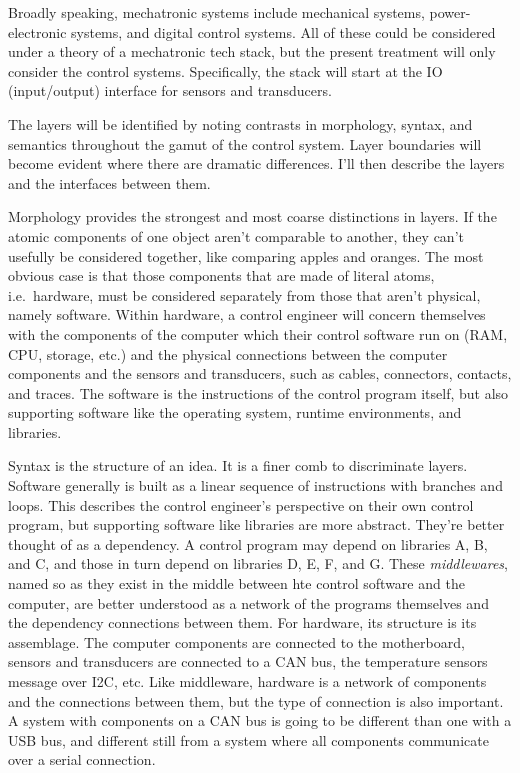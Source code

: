 \documentclass[english,12pt,a4paper,pdftex,eng,utf8]{aaltothesis}
\begin{document}
Broadly speaking, mechatronic systems include mechanical systems, power-electronic systems, and digital control systems. All of these could be considered under a theory of a mechatronic tech stack, but the present treatment will only consider the control systems. Specifically, the stack will start at the IO (input/output) interface for sensors and transducers.

The layers will be identified by noting contrasts in morphology, syntax, and semantics throughout the gamut of the control system. Layer boundaries will become evident where there are dramatic differences. I'll then describe the layers and the interfaces between them.

Morphology provides the strongest and most coarse distinctions in layers. If the atomic components of one object aren't comparable to another, they can't usefully be considered together, like comparing apples and oranges. The most obvious case is that those components that are made of literal atoms, i.e.\ hardware, must be considered separately from those that aren't physical, namely software. Within hardware, a control engineer will concern themselves with the components of the computer which their control software run on (RAM, CPU, storage, etc.) and the physical connections between the computer components and the sensors and transducers, such as cables, connectors, contacts, and traces. The software is the instructions of the control program itself, but also supporting software like the operating system, runtime environments, and libraries.

Syntax is the structure of an idea. It is a finer comb to discriminate layers. Software generally is built as a linear sequence of instructions with branches and loops. This describes the control engineer's perspective on their own control program, but supporting software like libraries are more abstract. They're better thought of as a dependency. A control program may depend on libraries A, B, and C, and those in turn depend on libraries D, E, F, and G. These \textit{middlewares}, named so as they exist in the middle between hte control software and the computer, are better understood as a network of the programs themselves and the dependency connections between them. For hardware, its structure is its assemblage. The computer components are connected to the motherboard, sensors and transducers are connected to a CAN bus, the temperature sensors message over I2C, etc. Like middleware, hardware is a network of components and the connections between them, but the type of connection is also important. A system with components on a CAN bus is going to be different than one with a USB bus, and different still from a system where all components communicate over a serial connection.
\end{document}
